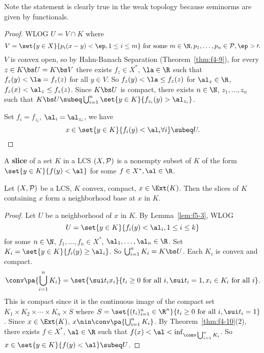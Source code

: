 Note the statement is clearly true in the weak topology because seminorms are given by functionals.
\begin{proof}
WLOG $U=V\cap K$ where 
\[
V=\set{y\in X}{p_i(x-y)<\ep,1\le i\le m}\text{ for some }m\in \N,p_1,\ldots, p_n\in \cal P,\ep>0.
\]
$V$ is convex open, so by Hahn-Banach Separation (Theorem~\ref{thm:f4-9}), for every $z\in K\bs U=K\bs V$ there exists $f_z\in X^*$, $\la\in \R$ such that $f_z(y)<\la=f_z(z)$ for all $y\in V$. So $f_z(y)<\la\le f_z(z)$ for $\al_z\in \R$, $f_z(x)<\al_z\le f_z(z)$. Since $K\bs U$ is compact, there exists $n\in \N$, $z_1,\ldots, z_n$ such that $K\bs U\subeq \bigcup_{i=1}^n \set{y\in K}{f_{z_i}(y)>\al_{z_i}}$.

Set $f_i=f_{z_i}$, $\al_i=\al_{z_i}$, we have 
\[
x\in \set{y\in K}{f_i(y)<\al_i\forall i}\subeq U.
\]
\end{proof}
A \textbf{slice} of a set $K$ in a LCS $(X,\cal P)$ is a nonempty subset of $K$ of the form $\set{y\in K}{f(y)<\al}$ for some $f\in X^*,\al\in \R$. 
\begin{lem}
Let $(X,\cal P)$ be a LCS, $K$ convex, compact, $x\in \Ext(K)$. Then the slices of $K$ containing $x$ form a neighborhood base at $x$ in $K$. 
\end{lem}
\begin{proof}
Let $U$ be a neighborhood of $x$ in $K$. By Lemma~\ref{lem:f5-3}, WLOG \[U=\set{y\in K}{f_i(y)<\al_i,1\le i\le k}\] for some $n\in \N$, $f_1,\ldots, f_n\in X^*$, $\al_1,\ldots, \al_n\in \R$. Set $K_i=\set{y\in K}{f_i(y)\ge\al_i}$. So $\bigcup_{i=1}^n K_i=K\bs U$. Each $K_i$ is convex and compact. 
\[
\conv\pa{\bigcup_{i=1}^n K_i}=\set{\sui t_ix_i}{t_i\ge 0\text{ for all }i,\sui t_i =1, x_i\in K_i\text{ for all }i}.
\] 
This is compact since it is the continuous image of the compact set $K_1\times K_2\times \cdots \times K_n\times S$ where $S=\set{(t_i)_{i=1}^n\in \R^n}{t_i\ge 0\text{ for all }i,\sui t_i=1}$. Since $x\in \Ext(K)$, $x\nin \conv\pa{\bigcup_{i=1}^nK_i}$. By Theorem~\ref{thm:f4-10}(2), there exists $f\in X^*$, $\al\in \R$ such that $f(x)<\al<\inf_{\conv\bigcup_{i=1}^n K_i}$. So $x\in \set{y\in K}{f(y)<\al}\subeq U$.
\end{proof}

